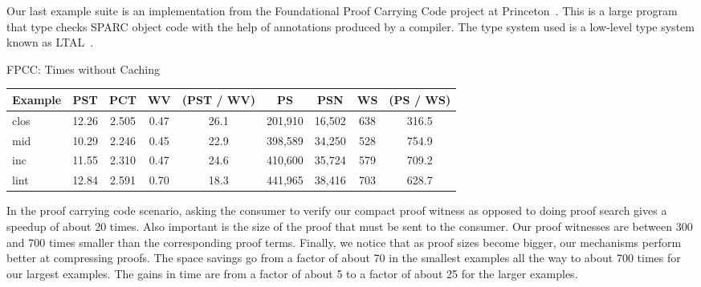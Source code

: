 \documentclass{llncs}
\begin{document}
Our last example suite is an implementation from the Foundational 
Proof Carrying Code project at Princeton~\cite{Appel01lics}. This 
is a large program that type checks SPARC object code with the help 
of annotations produced by a compiler. The type system used is a
low-level type system known as LTAL~\cite{chen+:fpcc-ltal}.

\begin{center}
FPCC: Times without Caching
\begin{small}
\begin{tabular}{|l|c|c|c|c|c|c|c|c|}
\hline
Example & PST & PCT & WV & (PST / WV) & PS & PSN & WS & (PS / WS)\\
\hline
clos & 12.26 & 2.505 & 0.47 & 26.1& 201,910 & 16,502 & 638 & 316.5\\
mid & 10.29 & 2.246 & 0.45 & 22.9& 398,589 & 34,250 & 528 & 754.9\\
inc & 11.55 & 2.310 & 0.47 & 24.6& 410,600 & 35,724 & 579 & 709.2\\
lint & 12.84 & 2.591 & 0.70 & 18.3& 441,965 & 38,416 & 703 & 628.7\\
\hline
\end{tabular}
\end{small}
\end{center}


In the proof carrying code scenario, asking the
consumer to verify our compact proof witness as opposed to doing proof
search gives a speedup of about 20 times. Also important is the size
of the proof that must be sent to the consumer. Our proof witnesses
are between 300 and 700 times smaller than the corresponding proof
terms.
Finally, we notice that as proof sizes become bigger, our mechanisms perform
better at compressing proofs.  The space savings go from a factor of
about 70 in the smallest examples all the way to about 700 times for
our largest examples. The gains in time are from a factor of about 5
to a factor of about 25 for the larger examples.
\end{document}
